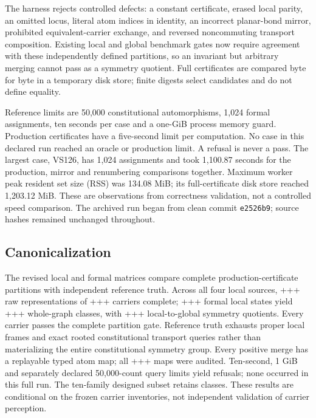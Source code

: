 \documentclass[pdflatex,sn-mathphys-num,referee,lineno]{sn-jnl}
\newcommand{\LocalAllRaw}{\the\numexpr\LocalInternalRaw+\LocalACSRaw+\LocalCIPRaw+\LocalRotARaw\relax}
\newcommand{\LocalAllCarriers}{\the\numexpr\LocalInternalCarriers+\LocalACSCarriers+\LocalCIPCarriers+\LocalRotACarriers\relax}
\newcommand{\LocalAllFormal}{\the\numexpr\LocalInternalFormal+\LocalACSFormal+\LocalCIPFormal+\LocalRotAFormal\relax}
\newcommand{\LocalAllObserved}{\the\numexpr\LocalInternalObserved+\LocalACSObserved+\LocalCIPObserved+\LocalRotAObserved\relax}
\newcommand{\LocalAllQuotients}{\the\numexpr\LocalInternalQuotients+\LocalACSQuotients+\LocalCIPQuotients+\LocalRotAQuotients\relax}
\newcommand{\code}[1]{\texttt{#1}}
\theoremstyle{plain}
\theoremstyle{remark}
\theoremstyle{definition}
\begin{document}
The harness rejects \MutationsRejected{} controlled defects: a constant
certificate, erased local parity, an omitted locus, literal atom indices in
identity, an incorrect planar-bond mirror, prohibited equivalent-carrier
exchange, and reversed noncommuting transport composition. Existing local and
global benchmark gates now require agreement with these independently defined
partitions, so an invariant but arbitrary merging cannot pass as a symmetry
quotient. Full certificates are compared byte for byte in a temporary disk
store; finite digests select candidates and do not define equality.

Reference limits are 50,000 constitutional automorphisms, 1,024 formal
assignments, ten seconds per case and a one-GiB process memory guard.
Production certificates have a five-second limit per computation. No case in
this declared run reached an oracle or production limit. A refusal is never a
pass. The largest case, VS126, has 1,024 assignments and took 1,100.87 seconds
for the production, mirror and renumbering comparisons together. Maximum
worker peak resident set size (RSS) was 134.08 MiB; its full-certificate disk store reached
1,203.12 MiB. These are observations from correctness validation, not a
controlled speed comparison. The archived run began from clean commit
\code{e2526b9}; source hashes remained unchanged throughout.

\subsection{Canonicalization}
\label{sec:canon-results}

The revised local and formal matrices compare complete production-certificate
partitions with independent reference truth. Across all four local sources,
\LocalAllRaw{} raw representations of \LocalAllCarriers{} carriers complete;
\LocalAllFormal{} formal local states yield \LocalAllObserved{} whole-graph
classes, with \LocalAllQuotients{} local-to-global symmetry quotients. Every
carrier passes the complete partition gate. Reference truth exhausts proper
local frames and exact rooted constitutional transport queries rather than
materializing the entire constitutional symmetry group. Every positive merge
has a replayable typed atom map; all \LocalAllFormal{} maps were audited.
Ten-second, 1 GiB and separately declared 50,000-count query limits yield
refusals; none occurred in this full run. The ten-family designed subset
retains \LocalInternalFormal{} classes. These results are conditional on the
frozen carrier inventories, not independent validation of carrier perception.
\end{document}
